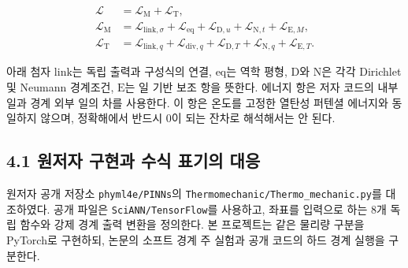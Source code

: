 \documentclass[10pt,a4paper]{article}
\begin{document}
\begin{equation}\begin{aligned}\mathcal L&=\mathcal L_{\mathrm M}+\mathcal L_{\mathrm T},\\\mathcal L_{\mathrm M}&=\mathcal L_{\mathrm{link},\sigma}+\mathcal L_{\mathrm{eq}}+\mathcal L_{\mathrm D,u}+\mathcal L_{\mathrm N,t}+\mathcal L_{\mathrm E,M},\\\mathcal L_{\mathrm T}&=\mathcal L_{\mathrm{link},q}+\mathcal L_{\mathrm{div},q}+\mathcal L_{\mathrm D,T}+\mathcal L_{\mathrm N,q}+\mathcal L_{\mathrm E,T}.\end{aligned}\end{equation}

아래 첨자 $\mathrm{link}$는 독립 출력과 구성식의 연결, $\mathrm{eq}$는 역학 평형, $\mathrm D$와 $\mathrm N$은 각각 Dirichlet 및 Neumann 경계조건, $\mathrm E$는 일 기반 보조 항을 뜻한다. 에너지 항은 저자 코드의 내부 일과 경계 외부 일의 차를 사용한다. 이 항은 온도를 고정한 열탄성 퍼텐셜 에너지와 동일하지 않으며, 정확해에서 반드시 0이 되는 잔차로 해석해서는 안 된다.\par

\subsection{4.1 원저자 구현과 수식 표기의 대응}

원저자 공개 저장소 \nolinkurl{phyml4e/PINNs}의 \nolinkurl{Thermomechanic/Thermo_mechanic.py}를 대조하였다. 공개 파일은 \nolinkurl{SciANN/TensorFlow}를 사용하고, 좌표를 입력으로 하는 8개 독립 함수와 강제 경계 출력 변환을 정의한다. 본 프로젝트는 같은 물리량 구분을 PyTorch로 구현하되, 논문의 소프트 경계 주 실험과 공개 코드의 하드 경계 실행을 구분한다.\par

\begingroup\small
\end{document}

